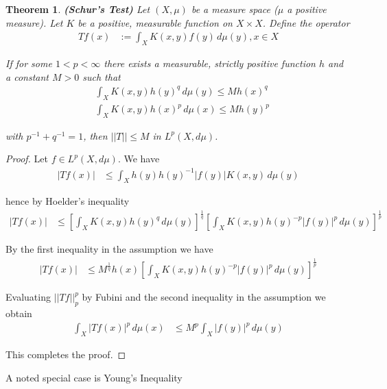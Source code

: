 \documentclass[12pt]{article}
\theoremstyle{definition}
\theoremstyle{plain}
\newtheorem{Lem}{Theorem}
\begin{document}
\begin{Lem}
\textbf{(Schur's Test)} Let $(X, \mu)$ be a measure space ($\mu$ a positive measure). Let $K$ be a positive, measurable function on $X \times X$. Define the operator
\begin{align*}
T f(x) &:= \int_X K(x,y) f(y) \,d\mu(y), x \in X
\end{align*}

If for some $1 < p < \infty$ there exists a measurable, strictly positive function $h$ and a constant $M > 0$ such that
\begin{align*}
&\int_X K(x,y) h(y)^q \,d\mu(y) \leq M h(x)^q \\
&\int_X K(x,y) h(x)^p \,d\mu(x) \leq M h(y)^p
\end{align*}

with $p^{-1} + q^{-1} = 1$, then $||T|| \leq M$ in $L^p(X, d\mu)$. 
\end{Lem}


\begin{proof}
Let $f \in L^p(X, d\mu)$. We have
\begin{align*}
|T f(x)| &\leq \int_{X} h(y) h(y)^{-1} |f(y)| K(x,y) \,d\mu(y) 
\end{align*}

hence by Hoelder's inequality
\begin{align*}
|T f(x)| &\leq \left[\int_X K(x,y) h(y)^q \,d\mu(y) \right]^{\frac{1}{q}} \left[\int_X K(x,y) h(y)^{-p} |f(y)|^p \,d\mu(y)\right]^{\frac{1}{p}}
\end{align*}

By the first inequality in the assumption we have
\begin{align*}
|T f(x)| &\leq M^{\frac{1}{q}} h(x) \left[\int_X K(x,y) h(y)^{-p} |f(y)|^p \,d\mu(y) \right]^{\frac{1}{p}}
\end{align*}

Evaluating $||T f||_p^p$ by Fubini and the second inequality in the assumption we obtain
\begin{align*}
\int_X |T f(x)|^p \,d\mu(x) &\leq M^p \int_X |f(y)|^p \,d\mu(y)
\end{align*}

This completes the proof. 
\end{proof}


A noted special case is Young's Inequality
\end{document}
